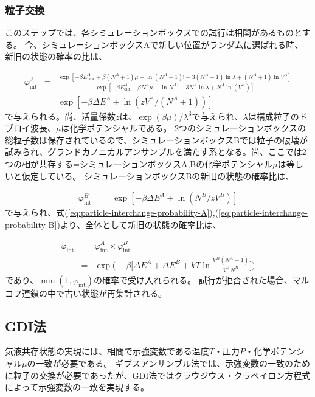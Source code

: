 \documentclass[titlepage]{jsreport}
\begin{document}
\subsubsection{粒子交換}\label{principle-subsubsec:particle-interchange}
このステップでは、各シミュレーションボックスでの試行は相関があるものとする。
今、シミュレーションボックスAで新しい位置がランダムに選ばれる時、新旧の状態の確率の比は、

\large
\begin{eqnarray}
\varphi_\mathrm{int}^A &=& \frac{\exp[-{\beta}E^A_\mathrm{new}+\beta(N^A+1)\mu-\ln(N^A+1)!-3(N^A+1)\ln\lambda+(N^A+1)\ln{V^A}]}{\exp[-{\beta}E^A_\mathrm{old}+{\beta}N^A{\mu}-\ln{N^A!}-3N^A\ln{\lambda}+N^A\ln(V^A)]}  \nonumber\\
                &=& \exp[-{\beta}{\Delta}E^A+\ln(zV^A/(N^A+1))]\label{eq:particle-interchange-probability-A}
\end{eqnarray}
\normalsize
で与えられる。尚、活量係数$z$は、$\exp(\beta\mu)/\lambda^3$で与えられ、$\lambda$は構成粒子のドブロイ波長、$\mu$は化学ポテンシャルである。
2つのシミュレーションボックスの総粒子数は保存されているので、シミュレーションボックスBでは粒子の破壊が試みられ、グランドカノニカルアンサンブルを満たす系となる。尚、ここでは2つの相が共存する=シミュレーションボックスA,Bの化学ポテンシャル$\mu$は等しいと仮定している。
シミュレーションボックスBの新旧の状態の確率比は、

\large
\begin{eqnarray}
\varphi_\mathrm{int}^B &=& \exp[-{\beta}{\Delta}E^A+\ln(N^B/zV^B)]\label{eq:particle-interchange-probability-B}
\end{eqnarray}
\normalsize
で与えられ、式(\ref{eq:particle-interchange-probability-A}),(\ref{eq:particle-interchange-probability-B})より、全体として新旧の状態の確率比は、

\large
\begin{eqnarray}
\varphi_\mathrm{int} &=& \varphi_\mathrm{int}^A×\varphi_\mathrm{int}^B \nonumber\\
              &=& \exp\Bigg(-\beta\bigg[{\Delta}E^A+{\Delta}E^B+{kT}\ln{\frac{V^B(N^A+1)}{V^AN^B}}\bigg]\Bigg)\label{eq:particle-interchange-probability-all}
\end{eqnarray}
\normalsize
であり、$\min(1, \varphi_\mathrm{int})$の確率で受け入れられる。
試行が拒否された場合、マルコフ連鎖の中で古い状態が再集計される。


\subsection{GDI法}\label{principle-subsec:gibbs-duhem-integration}
気液共存状態の実現には、相間で示強変数である温度$T$・圧力$P$・化学ポテンシャル$\mu$の一致が必要である。
ギブスアンサンブル法では、示強変数の一致のために粒子の交換が必要であったが、GDI法ではクラウジウス・クラペイロン方程式によって示強変数の一致を実現する。
\end{document}
